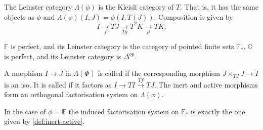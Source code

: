 \begin{definition} The Leinster category $\Lambda(\phi)$ is the Kleisli category of $T$. That is, it has the same objects as $\phi$ and $\Lambda(\phi)(I,J)=\phi(I,T(J)).$ Composition is given by $$I\xrightarrow[f]{} TJ\xrightarrow[Tg]{}T^2K\xrightarrow[\mu]{}TK.$$
\end{definition}

\begin{example}
    $\mathbb{F}$ is perfect, and its Leinster category is the category of pointed finite sets $\mathbb{F}_*$. $\mathbb{O}$ is perfect, and its Leinster category is $\Delta^{op}.$ 
\end{example}

\begin{definition}
    A morphism $I\rightarrow J$ in $\Lambda (\Phi)$ is called  if the corresponding morphism $J\times_{TJ}J\rightarrow I$ is an iso. It is called  if it factors as $I\rightarrow TI \xrightarrow{Tf} TJ$. The inert and active morphisms form an orthogonal factorisation system on $\Lambda(\phi)$.
\end{definition}

\begin{example}
    In the case of $\phi=\mathbb{F}$ the induced factorisation system on $\mathbb{F}_*$ is exactly the one given by \cref{def:inert-active}.
\end{example}

